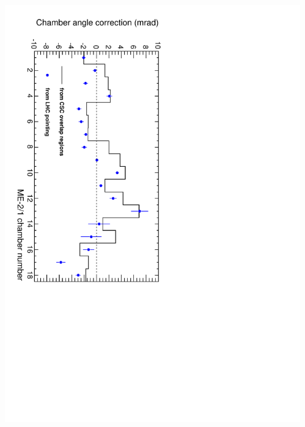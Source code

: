 \documentclass[compress]{beamer}
\begin{document}
\begin{frame}
\begin{columns}
\begin{center}
\end{center}
\begin{center}
\includegraphics[height=\linewidth, angle=90]{angle_comparison_meminus21.pdf}
\end{center}
\end{columns}
\end{frame}
\end{document}
